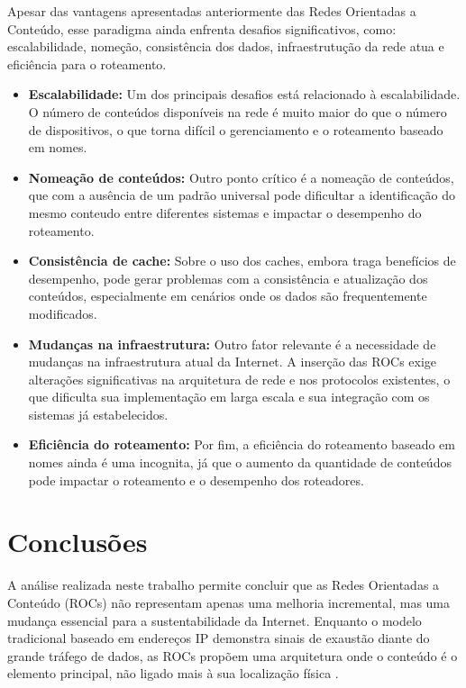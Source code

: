 \documentclass[12pt]{article}
\begin{document}
Apesar das vantagens apresentadas anteriormente das Redes Orientadas a Conteúdo, esse paradigma ainda enfrenta desafios significativos, como: escalabilidade, nomeção, consistência dos dados, infraestrutução da rede atua e eficiência para o roteamento.
\begin{itemize}

\item \textbf{Escalabilidade:}
Um dos principais desafios está relacionado à escalabilidade. O número de conteúdos disponíveis na rede é muito maior do que o número de dispositivos, o que torna difícil o gerenciamento e o roteamento baseado em nomes.

\item \textbf{Nomeação de conteúdos:}
Outro ponto crítico é a nomeação de conteúdos, que com a ausência de um padrão universal pode dificultar a identificação do mesmo conteudo entre diferentes sistemas e impactar o desempenho do roteamento.

\item \textbf{Consistência de cache:}
Sobre o uso dos caches, embora traga benefícios de desempenho, pode gerar problemas com a consistência e atualização dos conteúdos, especialmente em cenários onde os dados são frequentemente modificados.

\item \textbf{Mudanças na infraestrutura:}
Outro fator relevante é a necessidade de mudanças na infraestrutura atual da Internet. A inserção das ROCs exige alterações significativas na arquitetura de rede e nos protocolos existentes, o que dificulta sua implementação em larga escala e sua integração com os sistemas já estabelecidos.

\item \textbf{Eficiência do roteamento:}
Por fim, a eficiência do roteamento baseado em nomes ainda é uma incognita, já que o aumento da quantidade de conteúdos pode impactar o roteamento e o desempenho dos roteadores.
\end{itemize}

\section{Conclusões}

A análise realizada neste trabalho permite concluir que as Redes Orientadas a Conteúdo (ROCs) não representam apenas uma melhoria incremental, mas uma mudança essencial para a sustentabilidade da Internet. Enquanto o modelo tradicional baseado em endereços IP \cite{clark1988design} demonstra sinais de exaustão diante do grande tráfego de dados, as ROCs propõem uma arquitetura onde o conteúdo é o elemento principal, não ligado mais à sua localização física \cite{ambiel2013redes}.
\end{document}

